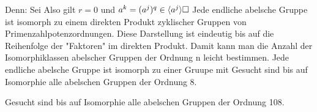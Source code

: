 Denn: Sei
Also gilt $r = 0$ und $a^k = (a^j)^q \in \langle a^j \rangle\hfill\square$
Jede endliche abelsche Gruppe ist isomorph zu einem direkten Produkt zyklischer Gruppen von Primenzahlpotenzordnungen.
Diese Darstellung ist eindeutig bis auf die Reihenfolge der "Faktoren" im direkten Produkt.
Damit kann man die Anzahl der Isomorphiklassen abelscher Gruppen der Ordnung n leicht bestimmen.
Jede endliche abelsche Gruppe ist isomorph zu einer Gruupe
mit
Gesucht sind bis auf Isomorphie alle abelschen Gruppen der Ordnung 8.

Gesucht sind bis auf Isomorphie alle abelschen Gruppen der Ordnung 108.

